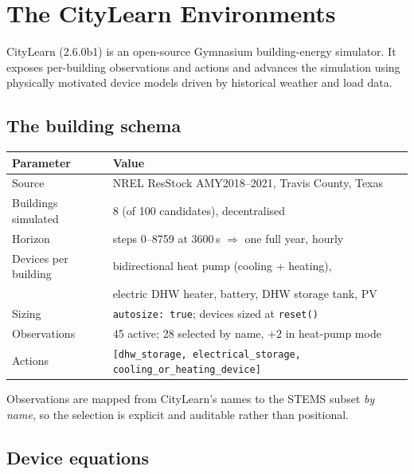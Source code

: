 \documentclass[11pt]{article}
\begin{document}
\section{The CityLearn Environments}
\label{sec:citylearn}

CityLearn (2.6.0b1) is an open-source Gymnasium building-energy simulator. It
exposes per-building observations and actions and advances the simulation using
physically motivated device models driven by historical weather and load data.

\subsection{The building schema}

\begin{center}
\begin{tabular}{ll}
\toprule
Parameter & Value \\
\midrule
Source & NREL ResStock AMY2018--2021, Travis County, Texas \\
Buildings simulated & 8 (of 100 candidates), decentralised \\
Horizon & steps 0--8759 at 3600\,s $\Rightarrow$ one full year, hourly \\
Devices per building & bidirectional heat pump (cooling + heating), \\
 & electric DHW heater, battery, DHW storage tank, PV \\
Sizing & \texttt{autosize: true}; devices sized at \texttt{reset()} \\
Observations & 45 active; 28 selected by name, $+2$ in heat-pump mode \\
Actions & \texttt{[dhw\_storage, electrical\_storage, cooling\_or\_heating\_device]} \\
\bottomrule
\end{tabular}
\end{center}

Observations are mapped from CityLearn's names to the STEMS subset \emph{by
name}, so the selection is explicit and auditable rather than positional.

\subsection{Device equations}
\end{document}
